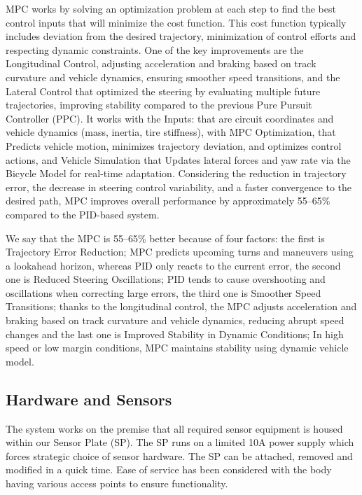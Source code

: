 \documentclass[a4paper,11pt]{report}
\begin{document}
MPC works by solving an optimization problem at each step to find the best control inputs that will minimize the cost function. This cost function typically includes deviation from the desired trajectory, minimization of control efforts and respecting dynamic constraints. One of the key improvements are the Longitudinal Control, adjusting acceleration and braking based on track curvature and vehicle dynamics, ensuring smoother speed transitions, and the Lateral Control that optimized the steering by evaluating multiple future trajectories, improving stability compared to the previous Pure Pursuit Controller (PPC). It works with the Inputs: that are circuit coordinates and vehicle dynamics (mass, inertia, tire stiffness), with MPC Optimization, that Predicts vehicle motion, minimizes trajectory deviation, and optimizes control actions, and Vehicle Simulation that Updates lateral forces and yaw rate via the Bicycle Model for real-time adaptation. Considering the reduction in trajectory error, the decrease in steering control variability, and a faster convergence to the desired path, MPC improves overall performance by approximately 55--65\% compared to the PID-based system.

We say that the MPC is 55--65\% better because of four factors: the first is Trajectory Error Reduction; MPC predicts upcoming turns and maneuvers using a lookahead horizon, whereas PID only reacts to the current error, the second one is Reduced Steering Oscillations; PID tends to cause overshooting and oscillations when correcting large errors, the third one is Smoother Speed Transitions; thanks to the longitudinal control, the MPC adjusts acceleration and braking based on track curvature and vehicle dynamics, reducing abrupt speed changes and the last one is Improved Stability in Dynamic Conditions; In high speed or low margin conditions, MPC maintains stability using dynamic vehicle model.

\subsection{Hardware and Sensors}

The system works on the premise that all required sensor equipment is housed within our Sensor Plate (SP). The SP runs on a limited 10A power supply which forces strategic choice of sensor hardware. The SP can be attached, removed and modified in a quick time. Ease of service has been considered with the body having various access points to ensure functionality.
\end{document}
